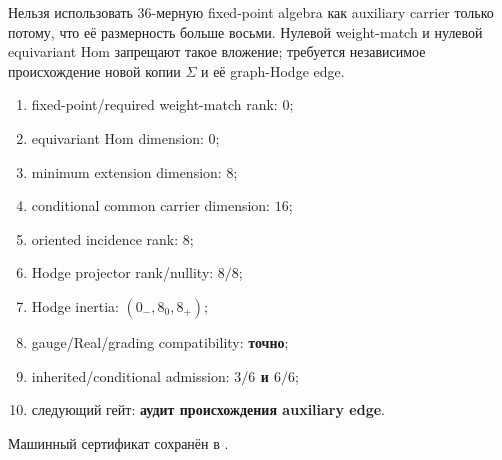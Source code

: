 \begin{nogocriterion}
Нельзя использовать 36-мерную fixed-point algebra как auxiliary carrier
только потому, что её размерность больше восьми. Нулевой weight-match и
нулевой equivariant Hom запрещают такое вложение; требуется независимое
происхождение новой копии $\Sigma$ и её graph-Hodge edge.
\end{nogocriterion}

\begin{protocol}\begin{enumerate}
\item fixed-point/required weight-match rank: \textbf{$0$};
\item equivariant Hom dimension: \textbf{$0$};
\item minimum extension dimension: \textbf{$8$};
\item conditional common carrier dimension: \textbf{$16$};
\item oriented incidence rank: \textbf{$8$};
\item Hodge projector rank/nullity: \textbf{$8/8$};
\item Hodge inertia: \textbf{$(0_-,8_0,8_+)$};
\item gauge/Real/grading compatibility: \textbf{точно};
\item inherited/conditional admission: \textbf{$3/6$ и $6/6$};
\item следующий гейт: \textbf{аудит происхождения auxiliary edge}.
\end{enumerate}\end{protocol}

Машинный сертификат сохранён в
.